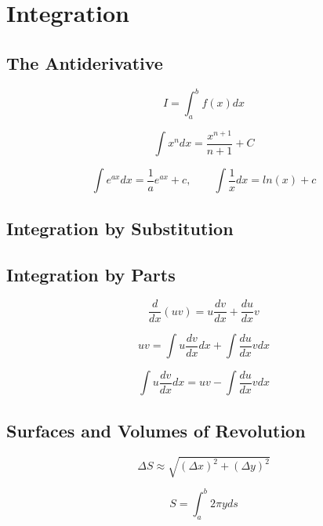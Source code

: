 \documentclass[]{report}
\begin{document}
\chapter{Integration}
\section{The Antiderivative}

\begin{equation*}
    I = \int_{a}^{b} f(x)dx
\end{equation*}

\begin{equation*}
    \int x^{n}dx = \frac{x^{n+1}}{n+1} + C
\end{equation*}

\[\int e^{ax}dx = \frac{1}{a}e^{ax} + c, \qquad \int \frac{1}{x}dx = ln(x) + c\]

\section{Integration by Substitution}
\section{Integration by Parts}

\begin{equation*}
    \frac{d}{dx}(uv) = u \frac{dv}{dx} + \frac{du}{dx} v
\end{equation*}

\begin{equation*}
    uv = \int u \frac{dv}{dx} dx + \int \frac{du}{dx}vdx
\end{equation*}
    
\begin{equation*}
    \int u \frac{dv}{dx} dx = uv - \int \frac{du}{dx}vdx
\end{equation*}

\section{Surfaces and Volumes of Revolution}

\begin{equation*}
    \Delta S \approx \sqrt{(\Delta x)^{2} + (\Delta y)^{2}}
\end{equation*}

\begin{equation*}
    S = \int_{a}^{b} 2 \pi y ds
\end{equation*}
\end{document}
